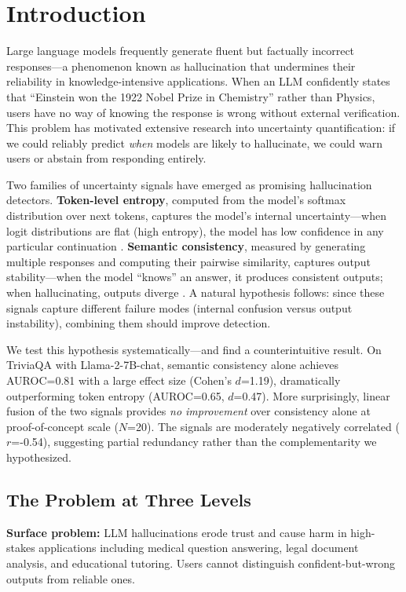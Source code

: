 \section{Introduction}

Large language models frequently generate fluent but factually incorrect responses---a phenomenon known as hallucination that undermines their reliability in knowledge-intensive applications. When an LLM confidently states that ``Einstein won the 1922 Nobel Prize in Chemistry'' rather than Physics, users have no way of knowing the response is wrong without external verification. This problem has motivated extensive research into uncertainty quantification: if we could reliably predict \emph{when} models are likely to hallucinate, we could warn users or abstain from responding entirely.

Two families of uncertainty signals have emerged as promising hallucination detectors. \textbf{Token-level entropy}, computed from the model's softmax distribution over next tokens, captures the model's internal uncertainty---when logit distributions are flat (high entropy), the model has low confidence in any particular continuation \citep{kuhn2023semantic}. \textbf{Semantic consistency}, measured by generating multiple responses and computing their pairwise similarity, captures output stability---when the model ``knows'' an answer, it produces consistent outputs; when hallucinating, outputs diverge \citep{manakul2023selfcheckgpt}. A natural hypothesis follows: since these signals capture different failure modes (internal confusion versus output instability), combining them should improve detection.

We test this hypothesis systematically---and find a counterintuitive result. On TriviaQA with Llama-2-7B-chat, semantic consistency alone achieves AUROC=0.81 with a large effect size (Cohen's $d$=1.19), dramatically outperforming token entropy (AUROC=0.65, $d$=0.47). More surprisingly, linear fusion of the two signals provides \emph{no improvement} over consistency alone at proof-of-concept scale ($N$=20). The signals are moderately negatively correlated ($r$=-0.54), suggesting partial redundancy rather than the complementarity we hypothesized.

\subsection{The Problem at Three Levels}

\textbf{Surface problem:} LLM hallucinations erode trust and cause harm in high-stakes applications including medical question answering, legal document analysis, and educational tutoring. Users cannot distinguish confident-but-wrong outputs from reliable ones.

